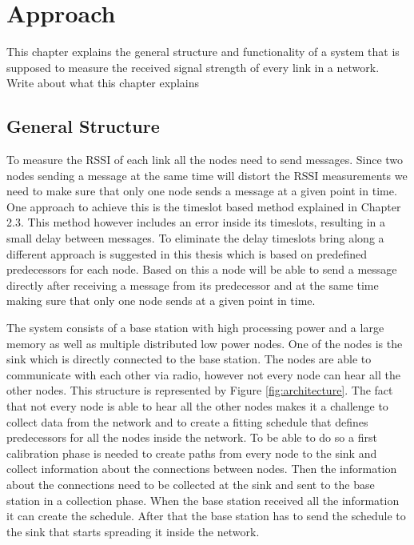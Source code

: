 \chapter{Approach}
This chapter explains the general structure and functionality of a system that is supposed to measure the received signal strength of every link in a network.
\TODO Write about what this chapter explains

\section{General Structure}

To measure the RSSI of each link all the nodes need to send messages. Since two nodes sending a message at the same time will distort the RSSI measurements we need to make sure that only one node sends a message at a given point in time. One approach to achieve this is the timeslot based method explained in Chapter 2.3. This method however includes an error inside its timeslots, resulting in a small delay between messages.
To eliminate the delay timeslots bring along a different approach is suggested in this thesis which is based on predefined predecessors for each node. Based on this a node will be able to send a message directly after receiving a message from its predecessor and at the same time making sure that only one node sends at a given point in time.

The system consists of a base station with high processing power and a large memory as well as multiple distributed low power nodes. One of the nodes is the sink which is directly connected to the base station. The nodes are able to communicate with each other via radio, however not every node can hear all the other nodes. This structure is represented by Figure \ref{fig:architecture}. The fact that not every node is able to hear all the other nodes makes it a challenge to collect data from the network and to create a fitting schedule that defines predecessors for all the nodes inside the network. To be able to do so a first calibration phase is needed to create paths from every node to the sink and collect information about the connections between nodes. Then the information about the connections need to be collected at the sink and sent to the base station in a collection phase. When the base station received all the information it can create the schedule. After that the base station has to send the schedule to the sink that starts spreading it inside the network. 

